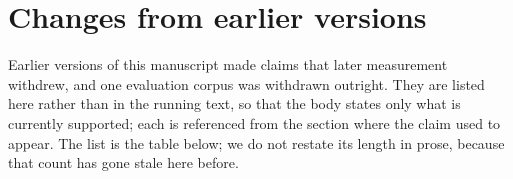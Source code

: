 \section{Changes from earlier versions}
\label{app:changes}

Earlier versions of this manuscript made claims that later measurement withdrew,
and one evaluation corpus was withdrawn outright. They are listed here rather than
in the running text, so that the body states only what is currently supported; each
is referenced from the section where the claim used to appear. The list is the
table below; we do not restate its length in prose, because that count has gone
stale here before.

